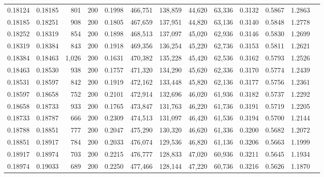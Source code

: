 \begin{tabular}{rrrrrrrrrrrrr}
0.18124 & 0.18185 &    801 & 200 &                                     0.1998 & 466,751 & 138,859 &  44,620 &  63,336 & 0.3132 & 0.5867 & 1.2863 \\
0.18185 & 0.18251 &    908 & 200 &                                     0.1805 & 467,659 & 137,951 &  44,820 &  63,136 & 0.3140 & 0.5848 & 1.2778 \\
0.18252 & 0.18319 &    854 & 200 &                                     0.1898 & 468,513 & 137,097 &  45,020 &  62,936 & 0.3146 & 0.5830 & 1.2699 \\
0.18319 & 0.18384 &    843 & 200 &                                     0.1918 & 469,356 & 136,254 &  45,220 &  62,736 & 0.3153 & 0.5811 & 1.2621 \\
0.18384 & 0.18463 &  1,026 & 200 &                                     0.1631 & 470,382 & 135,228 &  45,420 &  62,536 & 0.3162 & 0.5793 & 1.2526 \\
0.18463 & 0.18530 &    938 & 200 &                                     0.1757 & 471,320 & 134,290 &  45,620 &  62,336 & 0.3170 & 0.5774 & 1.2439 \\
0.18531 & 0.18597 &    842 & 200 &                                     0.1919 & 472,162 & 133,448 &  45,820 &  62,136 & 0.3177 & 0.5756 & 1.2361 \\
0.18597 & 0.18658 &    752 & 200 &                                     0.2101 & 472,914 & 132,696 &  46,020 &  61,936 & 0.3182 & 0.5737 & 1.2292 \\
0.18658 & 0.18733 &    933 & 200 &                                     0.1765 & 473,847 & 131,763 &  46,220 &  61,736 & 0.3191 & 0.5719 & 1.2205 \\
0.18733 & 0.18787 &    666 & 200 &                                     0.2309 & 474,513 & 131,097 &  46,420 &  61,536 & 0.3194 & 0.5700 & 1.2144 \\
0.18788 & 0.18851 &    777 & 200 &                                     0.2047 & 475,290 & 130,320 &  46,620 &  61,336 & 0.3200 & 0.5682 & 1.2072 \\
0.18851 & 0.18917 &    784 & 200 &                                     0.2033 & 476,074 & 129,536 &  46,820 &  61,136 & 0.3206 & 0.5663 & 1.1999 \\
0.18917 & 0.18974 &    703 & 200 &                                     0.2215 & 476,777 & 128,833 &  47,020 &  60,936 & 0.3211 & 0.5645 & 1.1934 \\
0.18974 & 0.19033 &    689 & 200 &                                     0.2250 & 477,466 & 128,144 &  47,220 &  60,736 & 0.3216 & 0.5626 & 1.1870 \\

\end{tabular}
